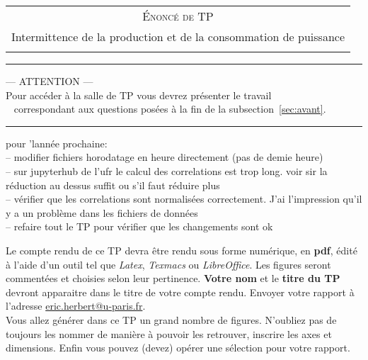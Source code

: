 \documentclass[12pt,french]{article}
\begin{document}
	
	
	
	\chead{}
	
	
\begin{center}
    \begin{tabular}{c}
        {\Large  \textsc{Énoncé de TP}}\\
        {\Large{Intermittence de la production et de la consommation de puissance}}\\
        \\
    \end{tabular}
    
    \normalsize 
    
    \hrule
    \vspace{0.5cm}
    
    --- ATTENTION ---\\
    Pour accéder à la salle de TP vous devrez présenter le travail \\ 
    correspondant aux questions posées à la fin de la subsection~\ref{sec:avant}.
    
    \vspace{0.5cm}
    \hrule
\end{center}

\alert{pour 'lannée prochaine: \\
-- modifier fichiers horodatage en heure directement (pas de demie heure) \\
-- sur jupyterhub de l'ufr le calcul des correlations est trop long. voir sir la réduction au dessus suffit ou s'il faut réduire plus\\
-- vérifier que les correlations sont normalisées correctement. J'ai l'impression qu'il y a un problème dans les fichiers de données \\
-- refaire tout le TP pour vérifier que les changements sont ok}
\vspace{1cm}

Le compte rendu de ce TP devra être rendu sous forme numérique, en \textbf{pdf},
édité à l'aide d'un outil tel que \textit{Latex}, \textit{Texmacs} ou \textit{LibreOffice}. Les figures seront
commentées et choisies selon leur pertinence.
\textbf{Votre nom} et le \textbf{titre du TP}  devront apparaitre dans le titre de votre compte rendu.
Envoyer votre rapport à l'adresse  \href{mailto:eric.herbert@u-paris.fr}{eric.herbert@u-paris.fr}. \\
Vous allez générer dans ce TP un grand nombre de figures. N'oubliez pas de toujours les nommer de manière à pouvoir les retrouver, inscrire les axes et dimensions. Enfin vous pouvez (devez) opérer une sélection pour votre rapport. 
\end{document}
